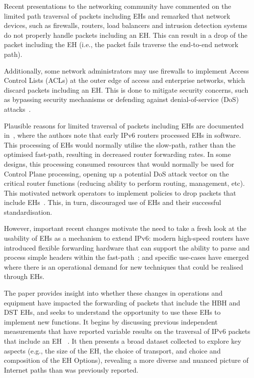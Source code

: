 \documentclass[conference]{IEEEtran}
\begin{document}
Recent presentations to the networking community have commented on the limited path traversal of packets including EHs and remarked that network devices, such as firewalls, routers, load balancers and intrusion detection systems~\cite{nalini-iepg114, fernando-talk} do not properly handle packets including an EH. This can result in a drop of the packet including the EH (i.e., the packet fails traverse the end-to-end network path).

Additionally, some network administrators may use firewalls to implement Access Control Lists (ACLs) at the outer edge of access and enterprise networks, which discard packets including an EH. This is done to mitigate security concerns, such as bypassing security mechanisms or defending against denial-of-service (DoS) attacks~\cite{naagas2021deh}.


Plausible reasons for limited traversal of packets including EHs are documented in~\cite{ietf-v6ops-hbh-03}, where the authors note that early IPv6 routers
processed EHs in software. This processing of EHs would normally utilise the slow-path, rather than the optimised fast-path, resulting in decreased router forwarding rates. In some designs, this processing consumed resources that would normally be used for Control Plane processing, opening up a potential DoS attack vector on the critical router functions (reducing ability to perform routing, management, etc). This motivated network operators to implement policies to drop packets that include EHs~\cite{rfc9098}.  This, in turn,
discouraged use of EHs and their successful standardisation. 

However, important recent changes motivate the need to take a fresh look at the usability of EHs as a mechanism to extend IPv6: modern high-speed routers have introduced flexible forwarding hardware that can support the ability to parse and process simple headers within the fast-path~\cite{programmable-data-plane, cisco-silicon-one, hauser2023}; and specific use-cases have emerged where there is an operational demand for new techniques that could be realised through EHs.


The paper provides insight into whether these changes in operations and equipment have impacted the forwarding of packets that include the HBH and DST EHs, and seeks to understand the opportunity to use these EHs to implement new functions. It begins by discussing previous independent measurements that have reported variable results on the traversal of IPv6 packets that include an EH~\cite{RFC7872} \cite{apnic} \cite{nalini-iepg114} \cite{james}.
It then presents a broad dataset collected to explore key aspects (e.g., the size of the EH, the choice of transport, and choice and composition of the EH Options), revealing a more diverse and nuanced picture of Internet paths than was previously reported.
\end{document}
